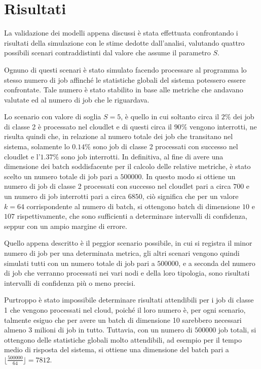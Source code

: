 \section{Risultati}
\newcommand{\epsmx}{$\varepsilon_{max}$}
La validazione dei modelli appena discussi è stata effettuata confrontando i
risultati della simulazione con le stime dedotte dall'analisi, valutando quattro
possibili scenari contraddistinti dal valore che assume il parametro $S$.

Ognuno di questi scenari è stato simulato facendo processare al programma lo
stesso numero di job affinché le statistiche globali del sistema potessero 
essere confrontate. Tale numero è stato stabilito in base alle metriche che
andavano valutate ed al numero di job che le riguardava.

Lo scenario con valore di soglia $S=5$, è quello in cui soltanto circa il $2\%$
dei job di classe 2 è processato nel cloudlet e di questi circa il $90\%$
vengono interrotti, ne risulta quindi che, in relazione al numero totale dei job
che transitano nel sistema, solamente lo $0.14\%$ sono job di classe 2
processati con successo nel cloudlet e l'$1.37\%$ sono job interrotti. In
definitiva, al fine di avere una dimensione dei batch soddisfacente per il
calcolo delle relative metriche, è stato scelto un numero totale di job pari a
$500000$. In questo modo si ottiene un numero di job di classe 2 processati con
successo nel cloudlet pari a circa $700$ e un numero di job interrotti pari a
circa $6850$, ciò significa che per un valore $k=64$ corrispondente al numero
di batch, si ottengono batch di dimensione $10$ e $107$ rispettivamente, che
sono sufficienti a determinare intervalli di confidenza, seppur con un ampio
margine di errore.

Quello appena descritto è il peggior scenario possibile, in cui si registra il
minor numero di job per una determinata metrica, gli altri scenari vengono
quindi simulati tutti con un numero totale di job pari a $500000$, e a seconda
del numero di job che verranno processati nei vari nodi e della loro tipologia,
sono risultati intervalli di confidenza più o meno precisi.

Purtroppo è stato impossibile determinare risultati attendibili per i job
di classe 1 che vengono processati nel cloud, poiché il loro numero è, per ogni
scenario, talmente esiguo che per avere un batch di dimensione 10 sarebbero
necessari almeno 3 milioni di job in tutto. Tuttavia, con un numero di
$500000$ job totali, si ottengono delle statistiche globali molto attendibili,
 ad esempio per il tempo medio di risposta del sistema, si ottiene 
una dimensione del batch pari a $\lfloor\frac{500000}{64}\rfloor = 7812$.

